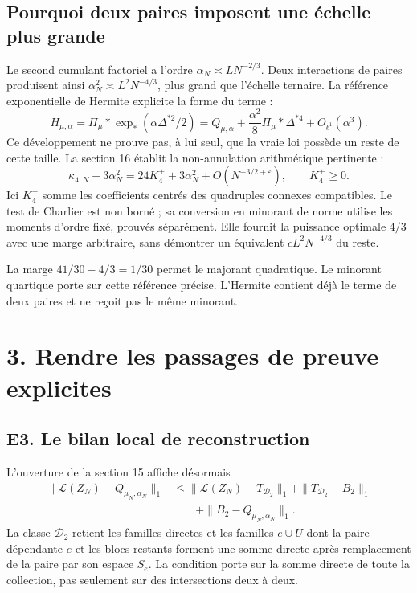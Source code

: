 \documentclass[11pt,a4paper]{article}
\newcommand{\Law}{\mathcal L}
\newcommand{\eps}{\varepsilon}
\begin{document}
\subsection*{Pourquoi deux paires imposent une échelle plus grande}
Le second cumulant factoriel a l'ordre \(\alpha_N\asymp LN^{-2/3}\).
Deux interactions de paires produisent ainsi
\(\alpha_N^2\asymp L^2N^{-4/3}\), plus grand que l'échelle ternaire.
La référence exponentielle de Hermite explicite la forme du terme :
\[
 H_{\mu,\alpha}
 =\Pi_\mu*\exp_*(\alpha\Delta^{*2}/2)
 =Q_{\mu,\alpha}
  +\frac{\alpha^2}{8}\Pi_\mu*\Delta^{*4}
  +O_{\ell^1}(\alpha^3).
\]
Ce développement ne prouve pas, à lui seul, que la vraie loi possède
un reste de cette taille. La section 16 établit la non-annulation
arithmétique pertinente :
\[
 \kappa_{4,N}+3\alpha_N^2
 =24K_4^++3\alpha_N^2+O(N^{-3/2+\eps}),\qquad K_4^+\ge0.
\]
Ici \(K_4^+\) somme les coefficients centrés des quadruples connexes
compatibles. Le test de Charlier est non borné ; sa conversion en
minorant de norme utilise les moments d'ordre fixé, prouvés séparément.
Elle fournit la puissance optimale \(4/3\) avec une marge arbitraire,
sans démontrer un équivalent \(cL^2N^{-4/3}\) du reste.

La marge \(41/30-4/3=1/30\) permet le majorant quadratique.
Le minorant quartique porte sur cette référence précise. L'Hermite
contient déjà le terme de deux paires et ne reçoit pas le même minorant.

\clearpage
\section*{3. Rendre les passages de preuve explicites}
\subsection*{E3. Le bilan local de reconstruction}
L'ouverture de la section 15 affiche désormais
\[
 \begin{aligned}
 \|\Law(Z_N)-Q_{\mu_N,\alpha_N}\|_1
 &\le \|\Law(Z_N)-T_{\mathscr D_2}\|_1
      +\|T_{\mathscr D_2}-B_2\|_1\\
 &\qquad+\|B_2-Q_{\mu_N,\alpha_N}\|_1.
 \end{aligned}
\]
La classe \(\mathscr D_2\) retient les familles directes et les
familles \(e\cup U\) dont la paire dépendante \(e\) et les blocs
restants forment une somme directe après remplacement de la paire
par son espace \(S_e\). La condition porte sur la somme directe
de toute la collection, pas seulement sur des intersections deux à deux.
\end{document}
